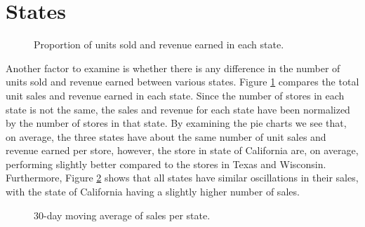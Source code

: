 \section{States}
\begin{figure}
    \vspace{-10pt}
    \centering
    \captionsetup{width=0.52\textwidth}
    \caption{Proportion of units sold and revenue earned in each state.}
    \label{fig:sales_rev_states}
    \vspace{-20pt}
\end{figure}

Another factor to examine is whether there is any difference in the number of units sold and revenue earned between various states.
Figure \ref{fig:sales_rev_states} compares the total unit sales and revenue earned in each state. 
Since the number of stores in each state is not the same, the sales and revenue for each state have been normalized by the number of stores in that state.
By examining the pie charts we see that, on average, the three states have about the same number of unit sales and revenue earned per store, however, the store in state of California are, on average, performing slightly better compared to the stores in Texas and Wisconsin. 
Furthermore, Figure \ref{fig:state_sales} shows that all states have similar oscillations in their sales, with the state of California having a slightly higher number of sales.
\begin{figure}[H]
    \centering
    \captionsetup{width=0.98\textwidth}
    \caption{30-day moving average of sales per state.}
    \label{fig:state_sales}
\end{figure} 


